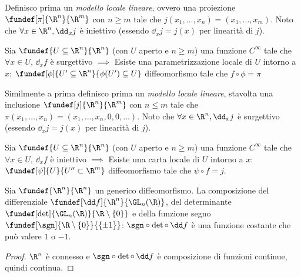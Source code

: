 Definisco prima un \emph{modello locale lineare}, ovvero una proiezione $\fundef[\pi]{\R^n}{\R^m}$ con $n \ge m$ tale che $j(x_1,\dots,x_n)=(x_1,\dots,x_m)$. Noto che $\forall x \in \R^n, \dd_xj$ è iniettivo (essendo $\dd_xj=j(x)$ per linearità di $j$).

\begin{teo}
\label{th:funimpsurg}
Sia $\fundef{U \subseteq \R^n}{\R^n}$ (con $U$ aperto e $n \ge m$) una funzione $C^\infty$ tale che $\forall x \in U$, $\dd_xf$ è surgettivo $\implies$ Esiste una parametrizzazione locale di $U$ intorno a $x$: $\fundef[\phi]{U'\subseteq \R^n}{\phi(U')\subseteq U}$ diffeomorfismo tale che $f \circ \phi = \pi$
\end{teo}

\begin{center}
\hspace{1cm}

\end{center}

Similmente a prima definisco prima un \emph{modello locale lineare}, stavolta una inclusione $\fundef[j]{\R^n}{\R^m}$ con $n \le m$ tale che $\pi(x_1,\dots,x_n)=(x_1,\dots,x_n,0,0,\dots)$. Noto che $\forall x \in \R^n, \dd_xj$ è surgettivo (essendo $\dd_xj=j(x)$ per linearità di $j$).

\begin{teo}

Sia $\fundef{U \subseteq \R^n}{\R^n}$ (con $U$ aperto e $n \ge m$) una funzione $C^\infty$ tale che $\forall x \in U$, $\dd_xf$ è iniettivo $\implies$ Esiste una carta locale di $U$ intorno a $x$: $\fundef[\psi]{U}{U''\subset \R^m}$ diffeomorfismo tale che $\psi \circ f = j$.
\end{teo}

\begin{center}

\end{center}

\begin{prop}
Sia $\fundef{\R^n}{\R^n}$ un generico diffeomorfismo. La composizione del differenziale $\fundef[\dd f]{\R^n}{\GL_n(\R)}$, del determinante $\fundef[\det]{\GL_n(\R)}{\R\setminus\{0\}}$ e della funzione segno $\fundef[\sgn]{\R\setminus\{0\}}{\{\pm1\}}$: $\sgn \circ \det \circ \,\dd f$ è una funzione costante che può valere $1$ o $-1$.
\end{prop}

\begin{proof}
$\R^n$ è connesso e $\sgn \circ \det \circ \,\dd f$ è composizione di funzioni continue, quindi continua.
\end{proof}

